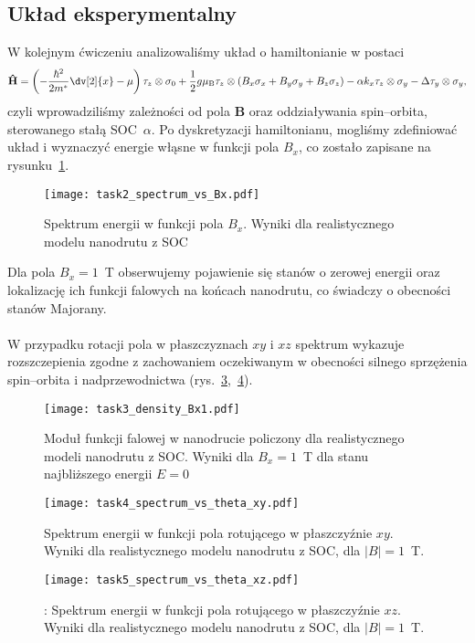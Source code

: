 \documentclass{article}
\newcommand{\opr}[1]{\mathbf{\hat{#1}}}
\begin{document}
\subsection{Układ eksperymentalny}
W kolejnym ćwiczeniu analizowaliśmy układ o hamiltonianie w postaci
\begin{equation}
    \opr{H} = \left(
    -\frac{\hbar^2}{2m^*}\dv[2]{x}-\mu
    \right)
    \tau_z\otimes \sigma_0 + \frac{1}{2}g\mu_{\text{B}}\tau_{z}\otimes \left(B_x\sigma_x + B_y\sigma_y+B_z\sigma_z\right)
    -\alpha k_x \tau_z \otimes \sigma_y-\Delta \tau_y\otimes \sigma_y,
\end{equation}
czyli wprowadziliśmy zależności od pola $\mathbf{B}$ oraz oddziaływania spin--orbita, sterowanego stałą SOC~$\alpha$.
Po dyskretyzacji hamiltonianu, mogliśmy zdefiniować układ i wyznaczyć energie włąsne w funkcji pola $B_x$, co zostało zapisane na rysunku~\ref{fig:task2-spectra}.
\begin{figure}[htp!]
    \centering
    \texttt{[image: task2\_spectrum\_vs\_Bx.pdf]}
    \caption{Spektrum energii w funkcji pola $B_x$. Wyniki dla realistycznego modelu nanodrutu z SOC}
    \label{fig:task2-spectra}
\end{figure}
Dla pola $B_x = 1$~T obserwujemy pojawienie się stanów o zerowej energii oraz lokalizację ich funkcji falowych na końcach nanodrutu, co świadczy o obecności stanów Majorany. \\
\\
W przypadku rotacji pola w płaszczyznach $xy$ i $xz$ spektrum wykazuje rozszczepienia zgodne z zachowaniem oczekiwanym w obecności silnego sprzężenia spin--orbita i nadprzewodnictwa (rys.~\ref{fig:energy-spectra-xy},~\ref{fig:denisty_xz}).
\begin{figure}[htp!]
    \centering
    \texttt{[image: task3\_density\_Bx1.pdf]}
\caption{Moduł funkcji falowej w nanodrucie policzony dla realistycznego modeli nanodrutu z SOC. Wyniki dla $B_x = 1$~T dla stanu najbliższego energii $E = 0$}
    \label{fig:denisty-Bx}
\end{figure}
\begin{figure}[htp!]
    \centering
    \texttt{[image: task4\_spectrum\_vs\_theta\_xy.pdf]}
\caption{Spektrum energii w funkcji pola rotującego w płaszczyźnie $xy$. Wyniki dla realistycznego modelu
nanodrutu z SOC, dla $|B| = 1$~T.}
    \label{fig:energy-spectra-xy}
\end{figure}
\begin{figure}[htp!]
    \centering
    \texttt{[image: task5\_spectrum\_vs\_theta\_xz.pdf]}
\caption{: Spektrum energii w funkcji pola rotującego w płaszczyźnie $xz$. Wyniki dla realistycznego modelu
nanodrutu z SOC, dla $|B| = 1 $~T.}
    \label{fig:denisty_xz}
\end{figure}
\end{document}
